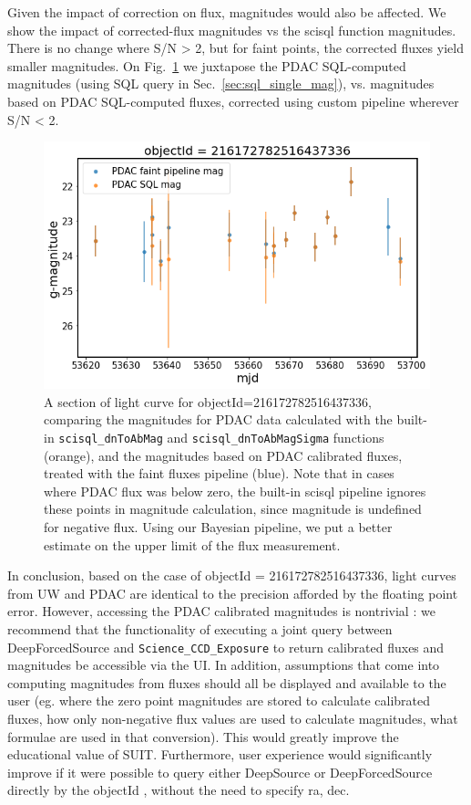 \documentclass[DM,lsstdraft,toc]{lsstdoc}
\begin{document}
Given the impact of correction on flux, magnitudes would also be affected.  We show the impact of corrected-flux magnitudes vs the scisql function magnitudes.  There is no change where S/N > 2, but for faint points, the corrected fluxes yield smaller magnitudes. On Fig.~\ref{fig:single_faint_detail_mag} we juxtapose the PDAC SQL-computed magnitudes (using SQL query in Sec.~\ref{sec:sql_single_mag}),  vs.  magnitudes based on PDAC SQL-computed fluxes, corrected using custom pipeline wherever S/N < 2.

\begin{figure}
\includegraphics[width=\textwidth]{figs/Single_PDAC_g_mag_compare_detail}
\cprotect\caption{A section of light curve for objectId=216172782516437336, comparing the magnitudes for PDAC data calculated with the built-in \verb|scisql_dnToAbMag| and  \verb|scisql_dnToAbMagSigma|  functions (orange), and the magnitudes based on PDAC calibrated fluxes, treated with the faint fluxes pipeline (blue).  Note that in cases where PDAC flux was below zero, the built-in scisql pipeline ignores these points in magnitude calculation, since magnitude is undefined for negative flux.  Using our Bayesian pipeline, we put a better estimate on the upper limit of the flux measurement.  }
\label{fig:single_faint_detail_mag}
\end{figure}

In conclusion, based on  the case of objectId = 216172782516437336,  light curves from UW and PDAC are identical to the precision afforded by the floating point error. However, accessing the PDAC calibrated magnitudes is nontrivial : we recommend that the functionality of executing a joint query between DeepForcedSource and \verb|Science_CCD_Exposure| to return calibrated fluxes and magnitudes be accessible via the UI.  In addition, assumptions that come into computing magnitudes from fluxes should all be displayed and available to the user     (eg. where the zero point magnitudes are stored to calculate calibrated fluxes, how only non-negative flux values are used to calculate magnitudes, what formulae are used in that conversion). This would greatly improve the educational value of SUIT.  Furthermore, user experience would significantly improve if it were possible to query either DeepSource or DeepForcedSource directly by the objectId , without the need to specify ra, dec.
\end{document}
